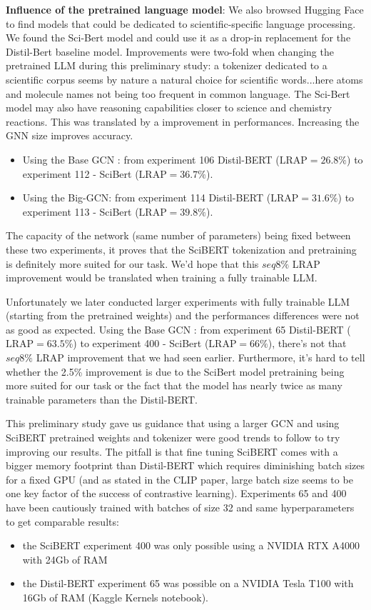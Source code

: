 \textbf{Influence of the pretrained language model}: We also browsed Hugging Face to find models that could be dedicated to scientific-specific language processing. We found the Sci-Bert\cite{scibert} model and could use it as a drop-in replacement for the Distil-Bert baseline model. Improvements were two-fold when changing the pretrained LLM during this preliminary study: a tokenizer dedicated to a scientific corpus seems by nature a natural choice for scientific words...here atoms and molecule names not being too frequent in common language. The Sci-Bert model may also have reasoning capabilities closer to science and chemistry reactions. This was translated by a improvement in performances. Increasing the GNN size improves accuracy.
\begin{itemize}
    \item Using the Base GCN : from experiment 106 Distil-BERT ($\text{LRAP}=26.8\%$) to experiment 112 - SciBert ($\text{LRAP}=36.7\%$).
    \item Using the Big-GCN: from experiment 114 Distil-BERT ($\text{LRAP}=31.6\%$) to experiment 113 - SciBert ($\text{LRAP}=39.8\%$).
\end{itemize}
The capacity of the network (same number of parameters) being fixed between these two experiments, it proves that the SciBERT tokenization and pretraining is definitely more suited for our task. We'd hope that this $seq 8\%$ LRAP improvement would be translated when training a fully trainable LLM.

Unfortunately we later conducted larger experiments with fully trainable LLM (starting from the pretrained weights) and the performances differences were not as good as expected. Using the Base GCN : from experiment 65 Distil-BERT ($\text{LRAP}=63.5\%$) to experiment 400 - SciBert ($\text{LRAP}=66\%$), there's not that $seq 8\%$ LRAP improvement that we had seen earlier. Furthermore, it's hard to tell whether the 2.5\% improvement is due to the SciBert model pretraining being more suited for our task or the fact that the model has nearly twice as many trainable parameters than the Distil-BERT. 

This preliminary study gave us guidance that using a larger GCN and using SciBERT pretrained weights and tokenizer were good trends to follow to try improving our results. The pitfall is that fine tuning SciBERT comes with a bigger memory footprint than Distil-BERT which requires diminishing batch sizes for a fixed GPU (and as stated in the CLIP paper, large batch size seems to be one key factor of the success of contrastive learning). Experiments 65 and 400 have been cautiously trained with batches of size 32 and same hyperparameters to get comparable results: 
\begin{itemize}
    \item the SciBERT experiment 400 was only possible using a NVIDIA RTX A4000 with 24Gb of RAM \item the Distil-BERT experiment 65 was possible on a NVIDIA Tesla T100 with 16Gb of RAM (Kaggle Kernels notebook).
\end{itemize}



